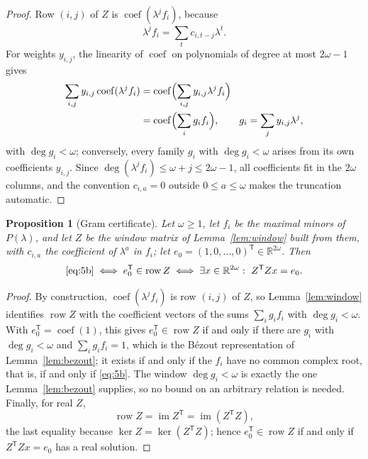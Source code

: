 \documentclass[journal]{IEEEtran}
\theoremstyle{plainn}
\newtheorem{prop}[thm]{Proposition}
\theoremstyle{remark}
\begin{document}
\begin{proof}
Row $(i,j)$ of $Z$ is $\operatorname{coef}(\lambda^jf_i)$, because
\begin{equation*}
\lambda^jf_i=\sum_t c_{i,t-j}\lambda^t .
\end{equation*}
For weights $y_{i,j}$, the linearity of $\operatorname{coef}$ on
polynomials of degree at most $2\omega-1$ gives
\begin{equation*}
\begin{aligned}
\sum_{i,j}y_{i,j}\operatorname{coef}(\lambda^jf_i)
&=\operatorname{coef}\Bigl(\sum_{i,j}y_{i,j}\lambda^jf_i\Bigr)\\
&=\operatorname{coef}\Bigl(\sum_i g_if_i\Bigr),
\qquad g_i=\sum_j y_{i,j}\lambda^j,
\end{aligned}
\end{equation*}
with $\deg g_i<\omega$; conversely, every family $g_i$ with
$\deg g_i<\omega$ arises from its own coefficients $y_{i,j}$. Since
$\deg(\lambda^jf_i)\le\omega+j\le2\omega-1$, all coefficients fit in
the $2\omega$ columns, and the convention $c_{i,a}=0$ outside
$0\le a\le\omega$ makes the truncation automatic.
\end{proof}

\begin{prop}[Gram certificate]\label{prop:gram}\label{sec:gram}
Let $\omega\ge1$, let $f_i$ be the maximal minors of $P(\lambda)$, and let $Z$ be the window
matrix of Lemma~\ref{lem:window} built from them, with $c_{i,a}$ the coefficient of $\lambda^a$
in $f_i$; let $e_0=(1,0,\ldots,0)^{\mathsf T}\in\mathbb R^{2\omega}$. Then
\begin{equation*}
\eqref{eq:5b}
\iff e_0^{\mathsf T}\in\operatorname{row}Z
\iff\exists x\in\mathbb R^{2\omega}:\ Z^{\mathsf T}Zx=e_0 .
\end{equation*}
\end{prop}

\begin{proof}
By construction, $\operatorname{coef}(\lambda^jf_i)$ is row $(i,j)$ of $Z$, so
Lemma~\ref{lem:window} identifies $\operatorname{row}Z$ with the coefficient vectors of the sums
$\sum_i g_if_i$ with $\deg g_i<\omega$. With $e_0^{\mathsf T}=\operatorname{coef}(1)$, this gives
$e_0^{\mathsf T}\in\operatorname{row}Z$ if and only if there are $g_i$ with $\deg g_i<\omega$ and
$\sum_i g_if_i=1$, which is the B\'ezout representation of Lemma~\ref{lem:bezout}; it exists if
and only if the $f_i$ have no common complex root, that is, if and only if \eqref{eq:5b}. The
window $\deg g_i<\omega$ is exactly the one Lemma~\ref{lem:bezout} supplies, so no bound on an
arbitrary relation is needed. Finally, for real $Z$,
\begin{equation*}
\operatorname{row}Z=\operatorname{im}Z^{\mathsf T}
=\operatorname{im}(Z^{\mathsf T}Z),
\end{equation*}
the last equality because $\ker Z=\ker(Z^{\mathsf T}Z)$; hence
$e_0^{\mathsf T}\in\operatorname{row}Z$ if and only if
$Z^{\mathsf T}Zx=e_0$ has a real solution.
\end{proof}
\end{document}
